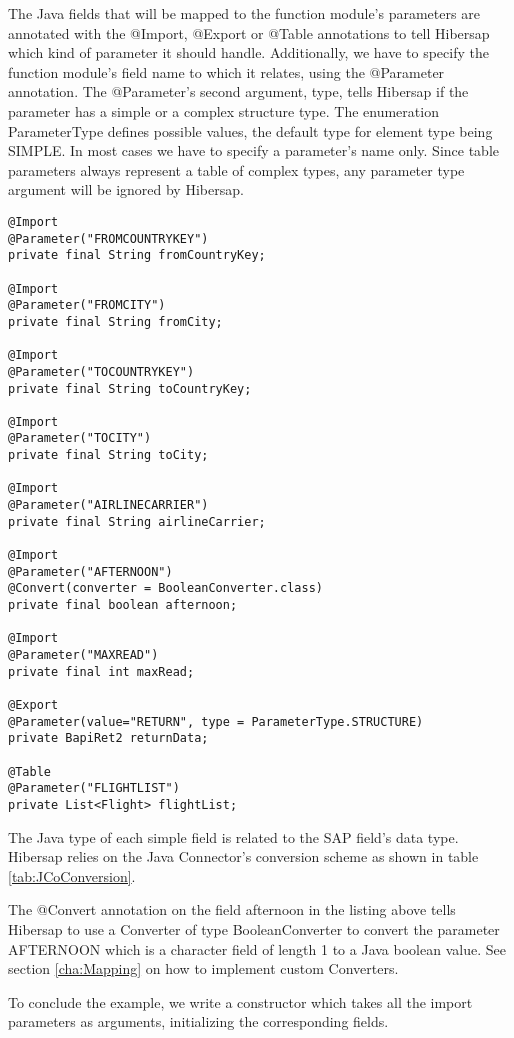 The Java fields that will be mapped to the function module's parameters are annotated with the
@Import, @Export or @Table annotations to tell Hibersap which kind of parameter it should handle.
Additionally, we have to specify the function module's field name
to which it relates, using the @Parameter annotation.
The @Parameter's second argument, type, tells Hibersap if the parameter has a simple or a complex structure type.
The enumeration ParameterType defines possible values, the default type for element type being SIMPLE.
In most cases we have to specify a parameter's name only. Since table parameters always represent
a table of complex types, any parameter type argument will be ignored by Hibersap.


\begin{lstlisting}[caption=The BAPI fields]
@Import
@Parameter("FROMCOUNTRYKEY")
private final String fromCountryKey;

@Import
@Parameter("FROMCITY")
private final String fromCity;

@Import
@Parameter("TOCOUNTRYKEY")
private final String toCountryKey;

@Import
@Parameter("TOCITY")
private final String toCity;

@Import
@Parameter("AIRLINECARRIER")
private final String airlineCarrier;

@Import
@Parameter("AFTERNOON")
@Convert(converter = BooleanConverter.class)
private final boolean afternoon;

@Import
@Parameter("MAXREAD")
private final int maxRead;

@Export
@Parameter(value="RETURN", type = ParameterType.STRUCTURE)
private BapiRet2 returnData;

@Table
@Parameter("FLIGHTLIST")
private List<Flight> flightList;
\end{lstlisting}

The Java type of each simple field is related to the SAP field's data type.
Hibersap relies on the Java Connector's conversion scheme as shown in table \ref{tab:JCoConversion}.

The @Convert annotation on the field afternoon in the listing above tells Hibersap
to use a Converter of type BooleanConverter to convert the parameter AFTERNOON which is a character field of length 1 to a
Java boolean value. See section \ref{cha:Mapping} on how to implement custom Converters.

To conclude the example, we write a constructor which takes all the import parameters as arguments,
initializing the corresponding fields.


